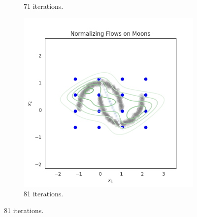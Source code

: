 \documentclass[shortabstract]{iithesis}
\begin{document}
\begin{figure}
\begin{subfigure}{0.32\textwidth}
    \caption{ 71 iterations.}
    \end{subfigure}
    \begin{subfigure}{0.32\textwidth}
    \includegraphics[scale=0.35]{flow_on_moons_8_penalty=0_grid.png}
    \caption{ 81 iterations.}
    \end{subfigure}
    

\end{figure}
\end{document}
